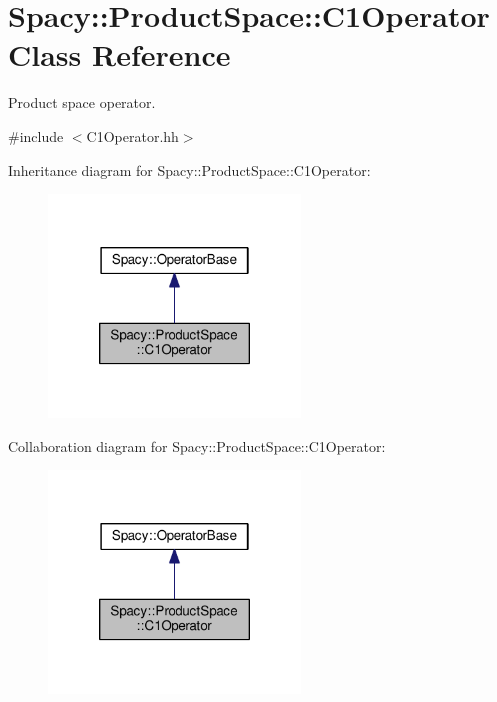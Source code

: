 \hypertarget{classSpacy_1_1ProductSpace_1_1C1Operator}{\section{Spacy\-:\-:Product\-Space\-:\-:C1\-Operator Class Reference}
\label{classSpacy_1_1ProductSpace_1_1C1Operator}
}


Product space operator.  




{\ttfamily \#include $<$C1\-Operator.\-hh$>$}



Inheritance diagram for Spacy\-:\-:Product\-Space\-:\-:C1\-Operator\-:
\nopagebreak
\begin{figure}[H]
\begin{center}
\leavevmode
\includegraphics[width=190pt]{classSpacy_1_1ProductSpace_1_1C1Operator__inherit__graph}
\end{center}
\end{figure}


Collaboration diagram for Spacy\-:\-:Product\-Space\-:\-:C1\-Operator\-:
\nopagebreak
\begin{figure}[H]
\begin{center}
\leavevmode
\includegraphics[width=190pt]{classSpacy_1_1ProductSpace_1_1C1Operator__coll__graph}
\end{center}
\end{figure}
